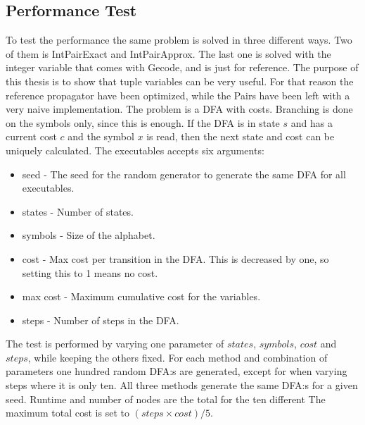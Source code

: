 \documentclass[a4paper,11pt]{article}
\begin{document}
\subsection{Performance Test}
\label{sec:performancetest}
To test the performance the same problem is solved in three different ways. Two of them is IntPairExact and IntPairApprox. The last one is solved with the integer variable that comes with Gecode, and is just for reference. The purpose of this thesis is to show that tuple variables can be very useful. For that reason the reference propagator have been optimized, while the Pairs have been left with a very naive implementation. The problem is a DFA with costs. Branching is done on the symbols only, since this is enough. If the DFA is in state $s$ and has a current cost $c$ and the symbol $x$ is read, then the next state and cost can be uniquely calculated. The executables accepts six arguments: 
\begin{itemize}
\item{seed} - The seed for the random generator to generate the same DFA for all executables.
\item{states} - Number of states.
\item{symbols} - Size of the alphabet.
\item{cost} - Max cost per transition in the DFA. This is decreased by one, so setting this to 1 means no cost.
\item{max cost} - Maximum cumulative cost for the variables.
\item{steps} - Number of steps in the DFA.
\end{itemize}
The test is performed by varying one parameter of $states$, $symbols$, $cost$ and $steps$, while keeping the others fixed. For each method and combination of parameters one hundred random DFA:s are generated, except for when varying steps where it is only ten. All three methods generate the same DFA:s for a given seed. Runtime and number of nodes are the total for the ten different The maximum total cost is set to $(steps\times cost)/5$.






%
\end{document}
